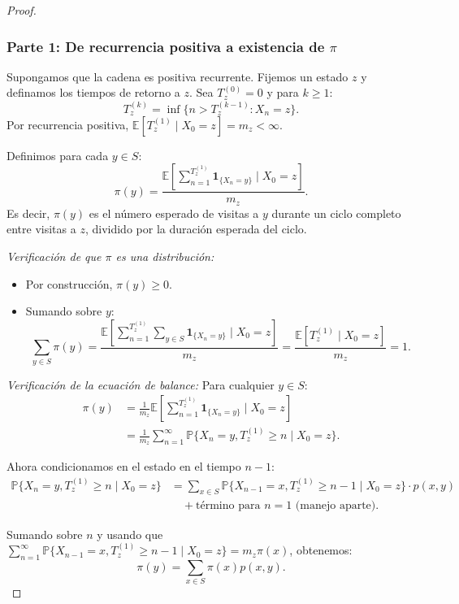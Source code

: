 \documentclass[11pt,a4paper]{article}
\theoremstyle{plain}
\theoremstyle{definition}
\theoremstyle{remark}
\newcommand{\1}{\mathds{1}}
\begin{document}
\begin{proof}
\subsubsection*{Parte 1: De recurrencia positiva a existencia de \(\pi\)}
Supongamos que la cadena es positiva recurrente. Fijemos un estado \(z\) y definamos los tiempos de retorno a \(z\). Sea \(T_z^{(0)} = 0\) y para \(k \geq 1\):
\[
T_z^{(k)} = \inf\{n > T_z^{(k-1)}: X_n = z\}.
\]
Por recurrencia positiva, \(\mathbb{E}[T_z^{(1)} \mid X_0 = z] = m_z < \infty\).

Definimos para cada \(y \in S\):
\[
\pi(y) = \frac{\mathbb{E}\left[\sum_{n=1}^{T_z^{(1)}} \mathbf{1}_{\{X_n = y\}} \mid X_0 = z\right]}{m_z}.
\]
Es decir, \(\pi(y)\) es el número esperado de visitas a \(y\) durante un ciclo completo entre visitas a \(z\), dividido por la duración esperada del ciclo.

\emph{Verificación de que \(\pi\) es una distribución:}
\begin{itemize}
\item Por construcción, \(\pi(y) \geq 0\).
\item Sumando sobre \(y\):
\[
\sum_{y\in S} \pi(y) = \frac{\mathbb{E}\left[\sum_{n=1}^{T_z^{(1)}} \sum_{y\in S} \mathbf{1}_{\{X_n = y\}} \mid X_0 = z\right]}{m_z} = \frac{\mathbb{E}[T_z^{(1)} \mid X_0 = z]}{m_z} = 1.
\]
\end{itemize}

\emph{Verificación de la ecuación de balance:}
Para cualquier \(y \in S\):
\[
\begin{aligned}
\pi(y) &= \frac{1}{m_z} \mathbb{E}\left[\sum_{n=1}^{T_z^{(1)}} \mathbf{1}_{\{X_n = y\}} \mid X_0 = z\right] \\
&= \frac{1}{m_z} \sum_{n=1}^{\infty} \mathbb{P}\{X_n = y, T_z^{(1)} \geq n \mid X_0 = z\}.
\end{aligned}
\]

Ahora condicionamos en el estado en el tiempo \(n-1\):
\[
\begin{aligned}
\mathbb{P}\{X_n = y, T_z^{(1)} \geq n \mid X_0 = z\} &= \sum_{x\in S} \mathbb{P}\{X_{n-1} = x, T_z^{(1)} \geq n-1 \mid X_0 = z\} \cdot p(x,y) \\
&\quad + \text{término para } n=1 \text{ (manejo aparte)}.
\end{aligned}
\]

Sumando sobre \(n\) y usando que \(\sum_{n=1}^{\infty} \mathbb{P}\{X_{n-1} = x, T_z^{(1)} \geq n-1 \mid X_0 = z\} = m_z \pi(x)\), obtenemos:
\[
\pi(y) = \sum_{x\in S} \pi(x) p(x,y).
\]


\end{proof}
\end{document}
